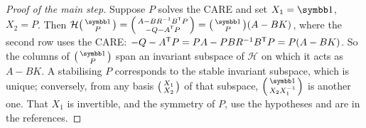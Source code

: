\begin{proof}[Proof of the main step]
Suppose $P$ solves the CARE and set $X_1 = \Id$, $X_2 = P$. Then
$\mathcal H\begin{psmallmatrix}\Id\\ P\end{psmallmatrix} = \begin{psmallmatrix}A - BR^{-1}B^\T P\\ -Q - A^\T P\end{psmallmatrix} = \begin{psmallmatrix}\Id\\ P\end{psmallmatrix}(A - BK)$, where the second row uses the CARE: $-Q - A^{\mathsf{T}} P = PA - PBR^{-1}B^{\mathsf{T}} P = P(A - BK)$. So the columns of $\begin{psmallmatrix}\Id\\ P\end{psmallmatrix}$ span an invariant subspace of $\mathcal H$ on which it acts as $A - BK$. A stabilising $P$ corresponds to the stable invariant subspace, which is unique; conversely, from any basis $\begin{psmallmatrix}X_1\\ X_2\end{psmallmatrix}$ of that subspace, $\begin{psmallmatrix}\Id\\ X_2X_1^{-1}\end{psmallmatrix}$ is another one. That $X_1$ is invertible, and the symmetry of $P$, use the hypotheses and are in the references.
\end{proof}

